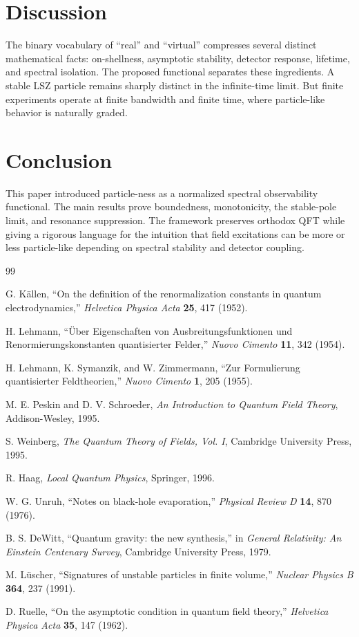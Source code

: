 \documentclass[11pt]{article}
\theoremstyle{remark}
\begin{document}
\section{Discussion}

The binary vocabulary of ``real'' and ``virtual'' compresses several distinct mathematical facts: on-shellness, asymptotic stability, detector response, lifetime, and spectral isolation. The proposed functional separates these ingredients. A stable LSZ particle remains sharply distinct in the infinite-time limit. But finite experiments operate at finite bandwidth and finite time, where particle-like behavior is naturally graded.

\section{Conclusion}

This paper introduced particle-ness as a normalized spectral observability functional. The main results prove boundedness, monotonicity, the stable-pole limit, and resonance suppression. The framework preserves orthodox QFT while giving a rigorous language for the intuition that field excitations can be more or less particle-like depending on spectral stability and detector coupling.

\begin{thebibliography}{99}

G. K\"allen,
``On the definition of the renormalization constants in quantum electrodynamics,''
\textit{Helvetica Physica Acta} \textbf{25}, 417 (1952).

H. Lehmann,
``\"Uber Eigenschaften von Ausbreitungsfunktionen und Renormierungskonstanten quantisierter Felder,''
\textit{Nuovo Cimento} \textbf{11}, 342 (1954).

H. Lehmann, K. Symanzik, and W. Zimmermann,
``Zur Formulierung quantisierter Feldtheorien,''
\textit{Nuovo Cimento} \textbf{1}, 205 (1955).

M. E. Peskin and D. V. Schroeder,
\textit{An Introduction to Quantum Field Theory}, Addison-Wesley, 1995.

S. Weinberg,
\textit{The Quantum Theory of Fields, Vol. I}, Cambridge University Press, 1995.

R. Haag,
\textit{Local Quantum Physics}, Springer, 1996.

W. G. Unruh,
``Notes on black-hole evaporation,''
\textit{Physical Review D} \textbf{14}, 870 (1976).

B. S. DeWitt,
``Quantum gravity: the new synthesis,'' in \textit{General Relativity: An Einstein Centenary Survey}, Cambridge University Press, 1979.

M. L\"uscher,
``Signatures of unstable particles in finite volume,''
\textit{Nuclear Physics B} \textbf{364}, 237 (1991).

D. Ruelle,
``On the asymptotic condition in quantum field theory,''
\textit{Helvetica Physica Acta} \textbf{35}, 147 (1962).

\end{thebibliography}
\end{document}
